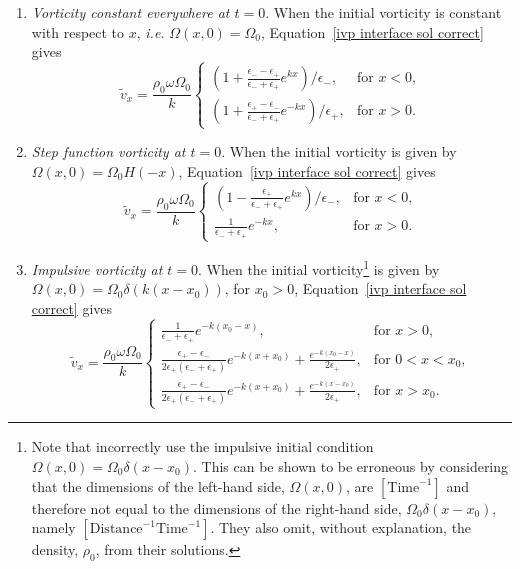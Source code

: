 \documentclass[12pt]{../style-files/ociamthesis}
\begin{document}
\begin{enumerate}
	\item \label{IC1} \textit{Vorticity constant everywhere at $t = 0$}. When the initial vorticity is constant with respect to $x$, \textit{i.e. } $\Omega(x,0) = \Omega_0$, Equation~\eqref{ivp interface sol correct} gives
	\begin{equation}
	\tilde{v}_x = \frac{\rho_0\omega\Omega_0}{k}
	\begin{cases}
	(1 + \frac{\epsilon_- - \epsilon_+}{\epsilon_- + \epsilon_+}e^{kx})/\epsilon_-, & \text{for } x<0, \\
	(1 + \frac{\epsilon_+ - \epsilon_-}{\epsilon_- + \epsilon_+}e^{-kx})/\epsilon_+, & \text{for } x>0.
	\end{cases}
	\end{equation}
	\item \label{IC2} \textit{Step function vorticity at $t = 0$}. When the initial vorticity is given by $\Omega(x,0) = \Omega_0H(-x)$, Equation~\eqref{ivp interface sol correct} gives
	\begin{equation}
	\tilde{v}_x = \frac{\rho_0\omega\Omega_0}{k}
	\begin{cases}
	(1 - \frac{\epsilon_+}{\epsilon_- + \epsilon_+}e^{kx})/\epsilon_-, & \text{for } x<0, \\
	\frac{1}{\epsilon_- + \epsilon_+}e^{-kx}, & \text{for } x>0.
	\end{cases}
	\end{equation}
	\item  \label{IC3} \textit{Impulsive vorticity at $t = 0$}. When the initial vorticity\footnote{Note that \cite{rae_etal81} incorrectly use the impulsive initial condition $\Omega(x,0) = \Omega_0\delta(x-x_0)$. This can be shown to be erroneous by considering that the dimensions of the left-hand side, $\Omega(x,0)$, are $[\mathrm{Time}^{-1}]$ and therefore not equal to the dimensions of the right-hand side, $\Omega_0\delta(x-x_0)$, namely $[\mathrm{Distance}^{-1}\mathrm{Time}^{-1}]$. They also omit, without explanation, the density, $\rho_0$, from their solutions.} is given by {$\Omega(x,0) = \Omega_0\delta(k(x-x_0))$}, for $x_0>0$, Equation~\eqref{ivp interface sol correct} gives
	\begin{equation}
	\tilde{v}_x = \frac{\rho_0\omega\Omega_0}{k}
	\begin{cases}
	\frac{1}{\epsilon_- + \epsilon_+}e^{-k(x_0 - x)}, & \text{for } x>0, \\
	\frac{\epsilon_+ - \epsilon_-}{2\epsilon_+(\epsilon_- + \epsilon_+)}e^{-k(x + x_0)} + \frac{e^{-k(x_0 - x)}}{2\epsilon_+}, & \text{for } 0<x<x_0, \\
	\frac{\epsilon_+ - \epsilon_-}{2\epsilon_+(\epsilon_- + \epsilon_+)}e^{-k(x + x_0)} + \frac{e^{-k(x - x_0)}}{2\epsilon_+}, & \text{for } x>x_0.
	\end{cases}
	\end{equation}
\end{enumerate}
\end{document}
